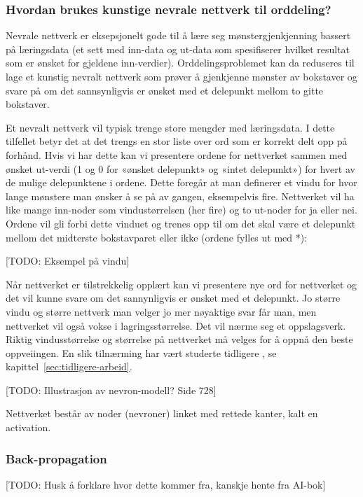 \subsubsection{Hvordan brukes kunstige nevrale nettverk til orddeling?}

Nevrale nettverk er eksepsjonelt gode til å lære seg mønstergjenkjenning bassert på læringsdata (et sett med inn-data og ut-data som spesifiserer hvilket resultat som er ønsket for gjeldene inn-verdier). Orddelingsproblemet kan da reduseres til lage et kunstig nevralt nettverk som prøver å gjenkjenne mønster av bokstaver og svare på om det sannsynligvis er ønsket med et delepunkt mellom to gitte bokstaver.

Et nevralt nettverk vil typisk trenge store mengder med læringsdata. I dette tilfellet betyr det at det trengs en stor liste over ord som er korrekt delt opp på forhånd. Hvis vi har dette kan vi presentere ordene for nettverket sammen med ønsket ut-verdi (1 og 0 for «ønsket delepunkt» og «intet delepunkt») for hvert av de mulige delepunktene i ordene. Dette foregår at man definerer et vindu for hvor lange mønstere man ønsker å se på av gangen, eksempelvis fire. Nettverket vil ha like mange inn-noder som vindustørrelsen (her fire) og to ut-noder for ja eller nei. Ordene vil gli forbi dette vinduet og trenes opp til om det skal være et delepunkt mellom det midterste bokstavparet eller ikke (ordene fylles ut med *):

[TODO: Eksempel på vindu]

Når nettverket er tilstrekkelig opplært kan vi presentere nye ord for nettverket og det vil kunne svare om det sannynligvis er ønsket med et delepunkt. Jo større vindu og større nettverk man velger jo mer nøyaktige svar får man, men nettverket vil også vokse i lagringsstørrelse. Det vil nærme seg et oppslagsverk. Riktig vindusstørrelse og størrelse på nettverket må velges for å oppnå den beste oppveiingen. En slik tilnærming har vært studerte tidligere \cite{kristensen1998two} \cite{smrvz1996word}, se kapittel~\ref{sec:tidligere-arbeid}.

[TODO: Illustrasjon av nevron-modell? Side 728]

Nettverket består av noder (nevroner)  linket med rettede kanter, kalt en activation. 

\subsubsection{Back-propagation}

[TODO: Husk å forklare hvor dette kommer fra, kanskje hente fra AI-bok]

